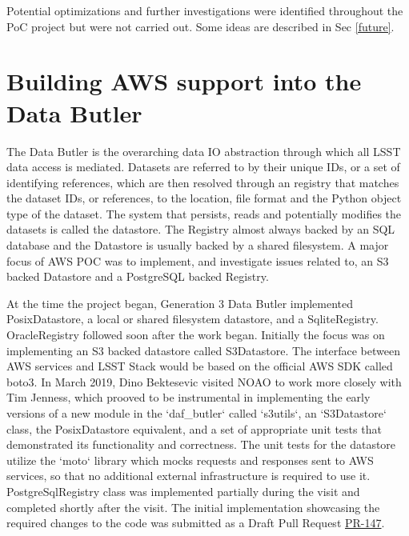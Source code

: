 Potential optimizations and further investigations were identified throughout the PoC project but were not carried out.
Some ideas are described in Sec \ref{future}.


\section{Building AWS support into the Data Butler}
\label{sec:butler}

The Data Butler is the overarching data IO abstraction through which all LSST data access is mediated. Datasets are referred to by their unique IDs, or a set of identifying references, which are then resolved through an registry that matches the dataset IDs, or references, to the location, file format and the Python object type of the dataset. The system that persists, reads and potentially modifies the datasets is called the datastore. The Registry almost always backed by an SQL database and the Datastore is usually backed by a shared filesystem. A major focus of AWS POC was to implement, and investigate issues related to, an S3 backed Datastore and a PostgreSQL backed Registry.

At the time the \poc project began, Generation 3 Data Butler implemented PosixDatastore, a local or shared filesystem datastore, and a SqliteRegistry. OracleRegistry followed soon after the \poc work began. Initially the focus was on implementing an S3 backed datastore called S3Datastore. The interface between AWS services and LSST Stack would be based on the official AWS SDK called boto3. In March 2019, Dino Bektesevic visited NOAO to work more closely with Tim Jenness, which prooved to be instrumental in implementing the early versions of a new module in the `daf\_butler` called `s3utils`, an `S3Datastore` class, the PosixDatastore equivalent, and a set of appropriate unit tests that demonstrated its functionality and correctness. The unit tests for the datastore utilize the `moto` library which mocks requests and responses sent to AWS services, so that no additional external infrastructure is required to use it. PostgreSqlRegistry class was implemented partially during the visit and completed shortly after the visit. The initial implementation showcasing the required changes to the code was submitted as a Draft Pull Request \href{https://github.com/lsst/daf_butler/pull/147}{PR-147}. 

